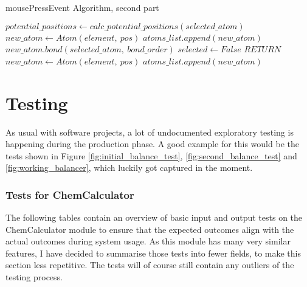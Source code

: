 \documentclass[a4paper,12pt]{article}
\begin{document}
\begin{algorithm}
\footnotesize
\caption{mousePressEvent Algorithm, second part}\label{alg:mousePressEvent_two}
\begin{algorithmic}
		\State $ potential\_positions\gets calc\_potential\_positions(selected\_atom)$
					\State $ new\_atom\gets Atom(element,\ pos)$
						\State $ atoms\_list.append(new\_atom)$
						\State $ new\_atom.bond(selected\_atom,\ bond\_order)$
					\EndIf
				\EndIf
			\EndFor
			\State $ selected\gets False$
		\EndIf
	\EndIf
\EndIf
{}
	\State $ RETURN$
\EndIf
\State $ new\_atom\gets Atom(element,\ pos)$
\State $ atoms\_list.append(new\_atom)$
\end{algorithmic}
\end{algorithm}

\newpage

\section{Testing}

As usual with software projects, a lot of undocumented exploratory testing is happening during the production phase. A good example for this would be the tests shown in Figure \ref{fig:initial_balance_test}, \ref{fig:second_balance_test} and \ref{fig:working_balancer}, which luckily got captured in the moment.

\subsubsection{Tests for ChemCalculator}

The following tables contain an overview of basic input and output tests on the ChemCalculator module to ensure that the expected outcomes align with the actual outcomes during system usage. As this module has many very similar features, I have decided to summarise those tests into fewer fields, to make this section less repetitive. The tests will of course still contain any outliers of the testing process.
\end{document}

